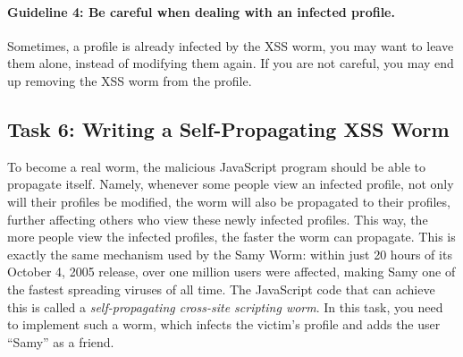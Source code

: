 \paragraph{Guideline 4: Be careful when dealing with an infected profile.}
Sometimes, a profile is already infected by the XSS worm, you may want to
leave them alone, instead of modifying them again. If you are not careful, 
you may end up removing the XSS worm from the profile. 


%



\subsection{Task 6: Writing a Self-Propagating XSS Worm}

To become a real worm, the malicious JavaScript program should be able to propagate itself.
Namely, whenever some people view an infected profile, 
not only will their profiles be modified, the worm will also be 
propagated to their profiles, further affecting others who view these newly infected profiles.
This way, the more people view the infected profiles, the faster the worm can propagate. 
This is exactly the same mechanism used by the Samy Worm: 
within just 20 hours of its October 4, 2005 release, over one million users 
were affected, making Samy one of the fastest spreading viruses of all time.
The JavaScript code that can achieve this is called 
a {\em self-propagating cross-site scripting worm}. In this task, you need to 
implement such a worm, which infects the victim's profile and adds the user
``Samy'' as a friend.

